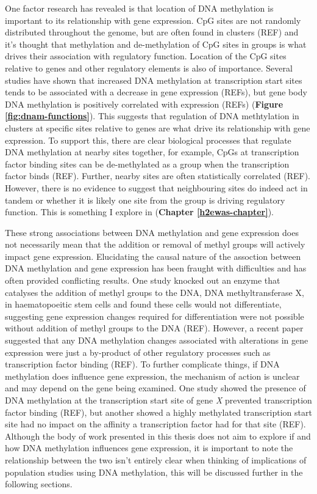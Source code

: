 \documentclass[11pt,twoside]{bristolthesis}
\begin{document}
One factor research has revealed is that location of DNA methylation is important to its relationship with gene expression. CpG sites are not randomly distributed throughout the genome, but are often found in clusters (REF) and it's thought that methylation and de-methylation of CpG sites in groups is what drives their association with regulatory function. Location of the CpG sites relative to genes and other regulatory elements is also of importance. Several studies have shown that increased DNA methylation at transcription start sites tends to be associated with a decrease in gene expression (REFs), but gene body DNA methylation is positively correlated with expression (REFs) (\textbf{Figure \ref{fig:dnam-functions}}). This suggests that regulation of DNA methtylation in clusters at specific sites relative to genes are what drive its relationship with gene expression. To support this, there are clear biological processes that regulate DNA methylation at nearby sites together, for example, CpGs at transcription factor binding sites can be de-methylated as a group when the transcription factor binds (REF). Further, nearby sites are often statistically correlated (REF). However, there is no evidence to suggest that neighbouring sites do indeed act in tandem or whether it is likely one site from the group is driving regulatory function. This is something I explore in (\textbf{Chapter \ref{h2ewas-chapter}}).

These strong associations between DNA methylation and gene expression does not necessarily mean that the addition or removal of methyl groups will actively impact gene expression. Elucidating the causal nature of the assoction between DNA methylation and gene expression has been fraught with difficulties and has often provided conflicting results. One study knocked out an enzyme that catalyses the addition of methyl groups to the DNA, DNA methyltransferase X, in haematopoeitic stem cells and found these cells would not differentiate, suggesting gene expression changes required for differentiation were not possible without addition of methyl groups to the DNA (REF). However, a recent paper suggested that any DNA methylation changes associated with alterations in gene expression were just a by-product of other regulatory processes such as transcription factor binding (REF). To further complicate things, if DNA methylation does influence gene expression, the mechanism of action is unclear and may depend on the gene being examined. One study showed the presence of DNA methylation at the transcription start site of gene \emph{X} prevented transcription factor binding (REF), but another showed a highly methylated transcription start site had no impact on the affinity a transcription factor had for that site (REF). Although the body of work presented in this thesis does not aim to explore if and how DNA methylation influences gene expression, it is important to note the relationship between the two isn't entirely clear when thinking of implications of population studies using DNA methylation, this will be discussed further in the following sections.
\end{document}
